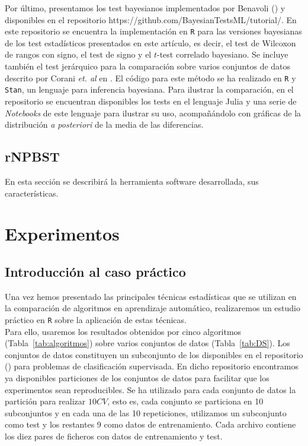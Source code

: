 	Por último, presentamos los test bayesianos implementados
por Benavoli (\cite{DBLP:journals/corr/BenavoliCDZ16}) y 
disponibles en el repositorio 
{https://github.com/BayesianTestsML/tutorial/}. 
En este repositorio se encuentra la implementación en 
\texttt{R} para las versiones bayesianas de los test 
estadísticos presentados en este artículo, es decir, 
el test de Wilcoxon de rangos con signo, el test de signo
y el $t$-test correlado bayesiano. Se incluye también el
test jerárquico para la comparación sobre varios conjuntos
de datos descrito por Corani \textit{et. al} en \cite{coranistatistical}. 
El código para este método se ha realizado
en \texttt{R} y \texttt{Stan}, un lenguaje para inferencia
bayesiana. Para ilustrar la comparación, en el repositorio
se encuentran disponibles los tests en el lenguaje Julia 
y una serie de \textit{Notebooks} 
de este lenguaje para ilustrar su uso, acompañándolo
con gráficas de la distribución \textit{a posteriori}
de la media de las diferencias.
	
	 
\section{rNPBST}

	En esta sección se describirá la herramienta software
desarrollada, sus características.

\chapter{Experimentos}
\label{chapter:experimentos}
\section{Introducción al caso práctico}
	Una vez hemos presentado las principales técnicas
estadísticas que se utilizan en la comparación de algoritmos
en aprendizaje automático, realizaremos un estudio práctico
en \texttt{R} sobre la aplicación de estas técnicas.\\
	Para ello, usaremos los resultados obtenidos por cinco
algoritmos (Tabla~\ref{tab:algoritmos}) 
sobre varios conjuntos de datos (Tabla~\ref{tab:DS}). Los
conjuntos de datos constituyen un subconjunto de los 
disponibles en el repositorio 
(\cite{alcala2010keel}) para problemas de clasificación
supervisada. En dicho repositorio encontramos ya disponibles
particiones de los conjuntos de datos para facilitar que los
experimentos sean reproducibles. Se ha utilizado para cada 
conjunto de datos la partición para realizar $10CV$, esto es,
cada conjunto se particiona en 10 subconjuntos y en cada una 
de las 10 repeticiones, utilizamos un subconjunto como test y
los restantes 9 como datos de entrenamiento. Cada archivo
contiene los diez pares de ficheros con datos de
entrenamiento y test.

